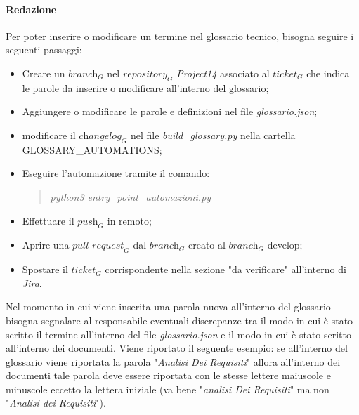 \paragraph{Redazione}
Per poter inserire o modificare un termine nel glossario tecnico, bisogna seguire i seguenti passaggi:
\begin{itemize}
    \item Creare un $\textit{branch}_G$ nel $\textit{repository}_G$ \emph{Project14} associato al $\textit{ticket}_G$ che indica le parole da inserire o modificare all'interno del glossario;
    \item Aggiungere o modificare le parole e definizioni nel file \emph{glossario.json};
    \item modificare il $\textit{changelog}_G$ nel file \emph{build\_glossary.py} nella cartella GLOSSARY\_AUTOMATIONS;
    \item Eseguire l'automazione tramite il comando:
        \begin{quote}
            \emph{  python3 entry\_point\_automazioni.py} 
        \end{quote}
    \item Effettuare il $\textit{push}_G$ in remoto;
    \item Aprire una $\textit{pull request}_G$ dal $\textit{branch}_G$ creato al $\textit{branch}_G$ develop;
    \item Spostare il $\textit{ticket}_G$ corrispondente nella sezione "da verificare" all'interno di \emph{Jira}.
\end{itemize}
Nel momento in cui viene inserita una parola nuova all'interno del glossario bisogna segnalare al responsabile eventuali discrepanze tra il modo in cui è stato scritto il termine all'interno del file \emph{glossario.json} e il modo in cui è stato scritto all'interno dei documenti. Viene riportato il seguente esempio: se all'interno del glossario viene riportata la parola "\emph{Analisi Dei Requisiti}" allora all'interno dei documenti tale parola deve essere riportata con le stesse lettere maiuscole e minuscole eccetto la lettera iniziale (va bene "\emph{analisi Dei Requisiti}" ma non "\emph{Analisi dei Requisiti}").

